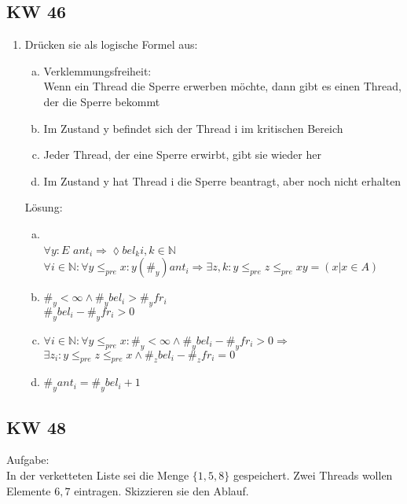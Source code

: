 \documentclass[a4paper,12pt]{scrartcl}
\begin{document}
\subsection{KW 46}

\begin{enumerate}
 \item Drücken sie als logische Formel aus:
    \begin{enumerate}[(a)]
	\item Verklemmungsfreiheit:\\
	Wenn ein Thread die Sperre erwerben möchte, dann gibt es einen Thread, der die Sperre bekommt
	\item Im Zustand y befindet sich der Thread i im kritischen Bereich
	\item Jeder Thread, der eine Sperre erwirbt, gibt sie wieder her 
	\item Im Zustand y hat Thread i die Sperre beantragt, aber noch nicht erhalten
     \end{enumerate}

     Lösung:
     \begin{enumerate}[(a)]
      \item\quad\\
      $\forall y:E$ $ant_i \Rightarrow \lozenge bel_k$\quad$i,k\in\mathbb{N}$\\
      $\forall i \in \mathbb{N}: \forall y \leq_{pre} x: y(\#_y)ant_i \Rightarrow \exists z,k:y\leq_{pre}z\leq_{pre}x$\quad$y=(x|x\in A)$
     
     \item $\#_y < \infty \wedge \#_y bel_i > \#_y fr_i$\\
     $\#_ybel_i-\#_yfr_i > 0$
     
     \item $\forall i\in \mathbb{N}: \forall y \leq_{pre} x:\#_y<\infty \wedge \#_y bel_i - \#_y fr_i > 0 \Rightarrow$\\$\exists z_i: y\leq_{pre} z \leq_{pre} x \wedge \#_z bel_i - \#_z fr_i = 0$
     
     \item $\#_y ant_i = \#_y bel_i +1 $
     \end{enumerate}

\end{enumerate}


\subsection{KW 48}

Aufgabe:\\
In der verketteten Liste sei die Menge $\{1,5,8\}$ gespeichert. Zwei Threads wollen Elemente $6,7$ eintragen. Skizzieren sie den Ablauf.
\end{document}

